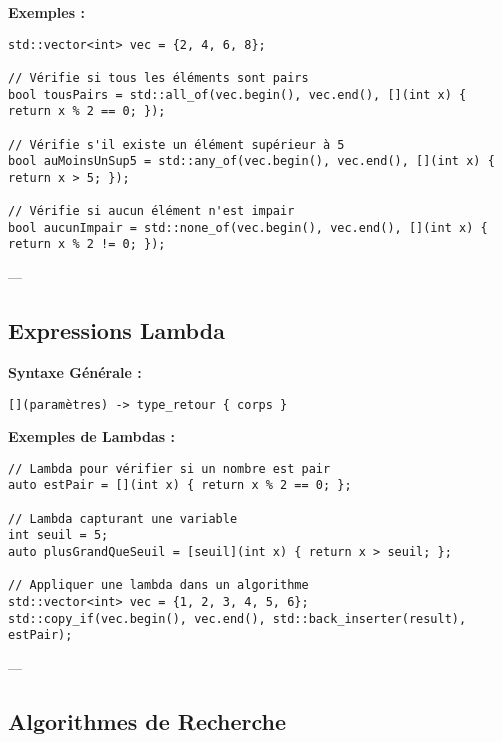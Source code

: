 \textbf{Exemples :}
\begin{tcolorbox}[colframe=blue!50!black, colback=blue!5!white, title=Exemples de Tests de Prédicats]
\begin{verbatim}
std::vector<int> vec = {2, 4, 6, 8};

// Vérifie si tous les éléments sont pairs
bool tousPairs = std::all_of(vec.begin(), vec.end(), [](int x) { return x % 2 == 0; });

// Vérifie s'il existe un élément supérieur à 5
bool auMoinsUnSup5 = std::any_of(vec.begin(), vec.end(), [](int x) { return x > 5; });

// Vérifie si aucun élément n'est impair
bool aucunImpair = std::none_of(vec.begin(), vec.end(), [](int x) { return x % 2 != 0; });
\end{verbatim}
\end{tcolorbox}

---

\subsection{ Expressions Lambda}
\textbf{Syntaxe Générale :}
\begin{tcolorbox}[colframe=blue!50!black, colback=blue!5!white, title=Syntaxe Générale des Lambdas]
\begin{verbatim}
[](paramètres) -> type_retour { corps }
\end{verbatim}
\end{tcolorbox}

\textbf{Exemples de Lambdas :}
\begin{tcolorbox}[colframe=blue!50!black, colback=blue!5!white, title=Exemples de Lambdas]
\begin{verbatim}
// Lambda pour vérifier si un nombre est pair
auto estPair = [](int x) { return x % 2 == 0; };

// Lambda capturant une variable
int seuil = 5;
auto plusGrandQueSeuil = [seuil](int x) { return x > seuil; };

// Appliquer une lambda dans un algorithme
std::vector<int> vec = {1, 2, 3, 4, 5, 6};
std::copy_if(vec.begin(), vec.end(), std::back_inserter(result), estPair);
\end{verbatim}
\end{tcolorbox}

---

\subsection{ Algorithmes de Recherche}
